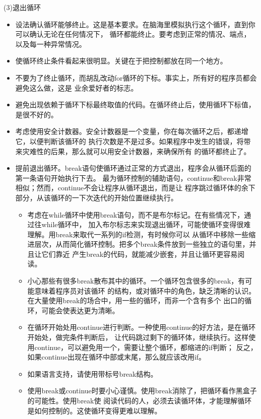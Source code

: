 \documentclass{article}
\begin{document}
\par
(3)退出循环
\par
\begin{itemize}
    \item 设法确认循环能够终止。这是基本要求。在脑海里模拟执行这个循环，直到你可以确认无论在任何情况下，
    循环都能终止。要考虑到正常的情况、端点，以及每一种异常情况。
    \item 使循环终止条件看起来很明显。关键在于把控制都放在同一个地方。
    \item 不要为了终止循环，而胡乱改动for循环的下标。事实上，所有好的程序员都会避免这么做，这是
    业余爱好者的标志。
    \item 避免出现依赖于循环下标最终取值的代码。在循环终止后，使用循环下标值，是很不好的。
    \item 考虑使用安全计数器。安全计数器是一个变量，你在每次循环之后，都递增它，以便判断该循环的
    执行次数是不是过多。如果程序中发生的错误，将带来灾难性的后果，那么就可以用安全计数器，来确保所有
    的循环都终止了。
    \item 提前退出循环。break语句使循环通过正常的方式退出，程序会从循环后面的第一条语句开始执行下去。
    最为循环控制的辅助语句，continue和break非常相似；然而，continue不会让程序从循环退出，而是让
    程序跳过循环体的余下部分，从该循环的一下次迭代的开始位置继续执行。
    \begin{itemize}
        \item 考虑在while循环中使用break语句，而不是布尔标记。在有些情况下，通过往while循环中，
        加入布尔标志来实现退出循环，可能使循环变得很难理解。用break来取代一系列的if检测，有时候你可以
        从循环中移除一些缩进层次，从而简化循环控制。把多个break条件放到一些独立的语句里，并且让它们靠近
        产生break的代码，就能减少嵌套，并且让循环更容易阅读。
        \item 小心那些有很多break散布其中的循环。一个循环包含很多的break，有可能意味着程序员对该循环
        的结构，或对循环中的角色，缺乏清晰的认识。在大量使用break的场合中，用一些的循环，而非一个含有多个
        出口的循环，可能会使表达更为清晰。
        \item 在循环开始处用continue进行判断。一种使用continue的好方法，是在循环开始处，做完条件判断后，
        让代码跳过剩下的循环体，继续执行。这样使用continue，可以避免用一个，需要让整个循环，都缩进的if判断；
        反之，如果continue出现在循环中部或末尾，那么就应该改用if。
        \item 如果语言支持，请使用带标号break结构。
        \item 使用break或continue时要小心谨慎。使用break消除了，把循环看作黑盒子的可能性。使用break使
        阅读代码的人，必须去读循环体，才能理解循环是如何控制的。这使循环变得更难以理解。
    \end{itemize}
\end{itemize}
\end{document}
